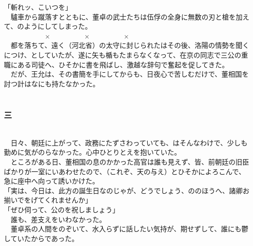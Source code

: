\documentclass[
  paper=a5,
  fontsize=10pt,
  jafontsize=9.5pt,
  tate,                  %
  open_bracket_pos=nibu, %
]{jlreq}
\begin{document}
「斬れッ、こいつを」\\


　驢車から蹴落すとともに、董卓の武士たちは伍俘の全身に無数の刃と槍を加えて、のようにしてしまった。\\


　　　　　　×　　　　　×　　　　　×\\


　都を落ちて、遠く（河北省）の太守に封じられたはその後、洛陽の情勢を聞くにつけ、としていたが、遂に矢も楯もたまらなくなって、在京の同志で三公の重職にある司徒へ、ひそかに書を飛ばし、激越な辞句で奮起を促してきた。\\


　だが、王允は、その書簡を手にしてからも、日夜心で苦しむだけで、董相国を討つ計はなにも持たなかった。\\

\\

\subsubsection{三}

\\


　日々、朝廷に上がって、政務にたずさわっていても、はそんなわけで、少しも勤めに気がのらなかった。心中ひとりとえを抱いていた。\\


　ところがある日、董相国の息のかかった高官は誰も見えず、皆、前朝廷の旧臣ばかりが一室にいあわせたので、（これぞ、天の与え）とひそかによろこんで、急に座中へ向って誘いかけた。\\


「実は、今日は、此方の誕生日なのじゃが、どうでしょう、ののほうへ、諸卿お揃いでをげてくれませんか」\\


「ぜひ伺って、公のを祝しましょう」\\


　誰も、差支えをいわなかった。\\


　董卓系の人間をのぞいて、水入らずに話したい気持が、期せずして、誰にも鬱していたからであった。\\
\end{document}
